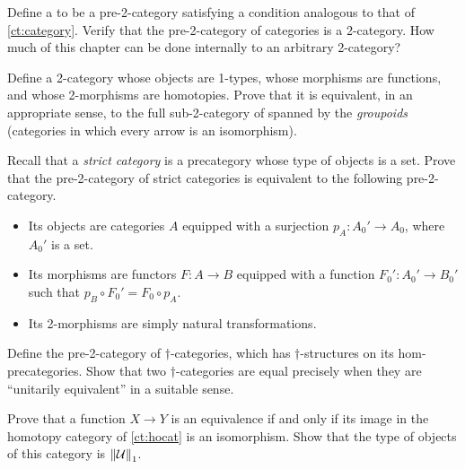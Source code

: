 \begin{ex}\label{ct:2cat}
  Define a 
  to be a pre-2-category satisfying a condition analogous to that of \cref{ct:category}.
  Verify that the pre-2-category of categories \ucat is a 2-category.
  How much of this chapter can be done internally to an arbitrary 2-category?
\end{ex}

\begin{ex}\label{ct:groupoids}
  Define a 2-category whose objects are 1-types, whose morphisms are functions, and whose 2-morphisms are homotopies.
  Prove that it is equivalent, in an appropriate sense, to the full sub-2-category of \ucat spanned by the \emph{groupoids} (categories in which every arrow is an isomorphism).
\end{ex}

\begin{ex}\label{ex:2strict-cat}
  Recall that a \emph{strict category} is a precategory whose type of objects is a set.
  Prove that the pre-2-category of strict categories is equivalent to the following pre-2-category.
  \begin{itemize}
  \item Its objects are categories $A$ equipped with a surjection
    $p_A:A_0'\to A_0$, where $A_0'$ is a set.
  \item Its morphisms are functors $F:A\to B$ equipped with a function $F_0':A_0' \to B_0'$ such that $p_B \circ F_0' = F_0 \circ p_A$.
  \item Its 2-morphisms are simply natural transformations.
  \end{itemize}
\end{ex}

\begin{ex}\label{ex:pre2dagger-cat}
  Define the pre-2-category of $\dagger$-categories, which has $\dagger$-struc\-tures on its hom-pre\-cat\-egories.
  Show that two $\dagger$-categories are equal precisely when they are ``unitarily equivalent'' in a suitable sense.
\end{ex}

\begin{ex}\label{ct:ex:hocat}
  Prove that a function $X\to Y$ is an equivalence if and only if its image in the homotopy category of \cref{ct:hocat} is an isomorphism.
  Show that the type of objects of this category is $\mathopen{}\left\Vert \mathcal{U}\right\Vert_{1}\mathclose{}$.
\end{ex}

